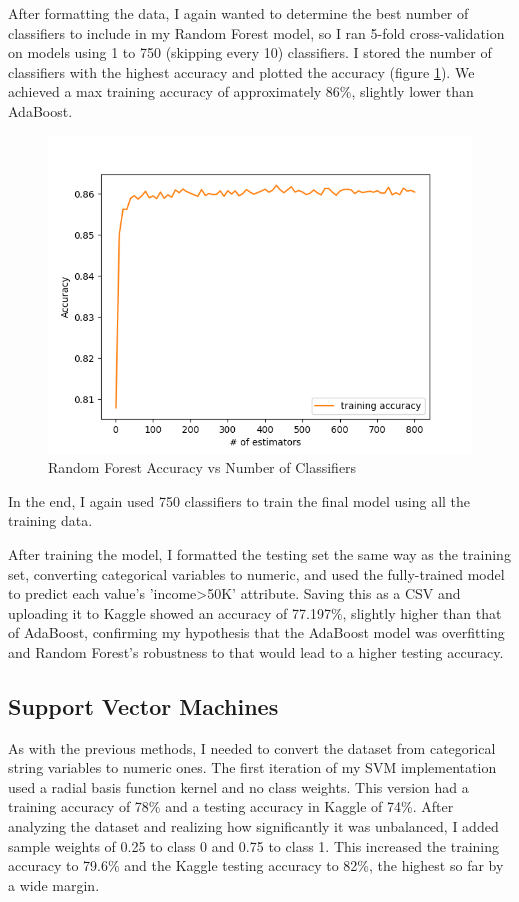\documentclass{article}
\begin{document}
After formatting the data, I again wanted to determine the best number of classifiers to include in my Random Forest model, so I ran 5-fold cross-validation on models using 1 to 750 (skipping every 10) classifiers. I stored the number of classifiers with the highest accuracy and plotted the accuracy (figure \ref{fig:rf}). We achieved a max training accuracy of approximately 86\%, slightly lower than AdaBoost. 

\begin{figure}[h]
    \centering
    \includegraphics[width=0.6\linewidth]{img/rf_acc.png}
    \caption{Random Forest Accuracy vs Number of Classifiers}
    \label{fig:rf}
\end{figure}

In the end, I again used 750 classifiers to train the final model using all the training data.

After training the model, I formatted the testing set the same way as the training set, converting categorical variables to numeric, and used the fully-trained model to predict each value's 'income>50K' attribute. Saving this as a CSV and uploading it to Kaggle showed an accuracy of 77.197\%, slightly higher than that of AdaBoost, confirming my hypothesis that the AdaBoost model was overfitting and Random Forest's robustness to that would lead to a higher testing accuracy.

\subsection{Support Vector Machines}

As with the previous methods, I needed to convert the dataset from categorical string variables to numeric ones. The first iteration of my SVM implementation used a radial basis function kernel and no class weights. This version had a training accuracy of 78\% and a testing accuracy in Kaggle of 74\%. After analyzing the dataset and realizing how significantly it was unbalanced, I added sample weights of 0.25 to class 0 and 0.75 to class 1. This increased the training accuracy to 79.6\% and the Kaggle testing accuracy to 82\%, the highest so far by a wide margin. 
\end{document}
